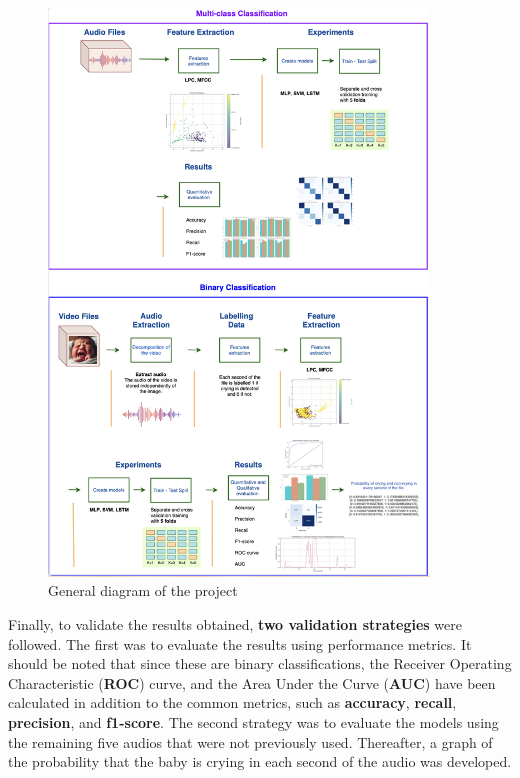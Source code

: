 \begin{figure}[H]
\centering
    \includegraphics[width=0.9\textwidth]{figures/Project-Diagram.png}
\caption{General diagram of the project}
\label{fig:Project-Diagram}
\end{figure}

Finally, to validate the results obtained, \textbf{two validation strategies} were followed. The first was to evaluate the results using performance metrics. It should be noted that since these are binary classifications, the Receiver Operating Characteristic (\textbf{ROC}) curve, and the Area Under the Curve (\textbf{AUC}) have been calculated in addition to the common metrics, such as \textbf{accuracy}, \textbf{recall}, \textbf{precision}, and \textbf{f1-score}. The second strategy was to evaluate the models using the remaining five audios that were not previously used. Thereafter, a graph of the probability that the baby is crying in each second of the audio was developed.


